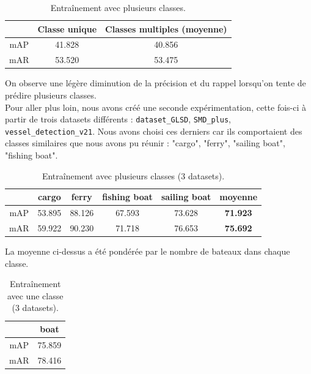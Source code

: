 \begin{table}[h]
    \begin{center}
        \begin{tabular}{c c c}
            \hline
            & Classe unique & Classes multiples (moyenne) \\
            \hline
                mAP & 41.828 & 40.856 \\
                mAR & 53.520 & 53.475 \\
        \end{tabular}
    \end{center}
    \caption{Entraînement avec plusieurs classes.}
\end{table}

On observe une légère diminution de la précision et du rappel lorsqu'on tente de prédire plusieurs
classes. \\

Pour aller plus loin, nous avons créé une seconde expérimentation, cette fois-ci à partir
de trois datasets différents : \texttt{dataset\_GLSD}, \texttt{SMD\_plus}, \texttt{vessel\_detection\_v21}.
Nous avons choisi ces derniers car ils comportaient des classes similaires que nous avons pu réunir :
"cargo", "ferry", "sailing boat", "fishing boat". \\

\begin{table}[H]
    \begin{center}
        \begin{tabular}{c c c c c c}
            \hline
            & cargo & ferry & fishing boat & sailing boat & \textbf{moyenne} \\
            \hline
                mAP & 53.895 & 88.126 & 67.593 & 73.628 & \textbf{71.923}\\
                mAR & 59.922 & 90.230 & 71.718 & 76.653 & \textbf{75.692}\\
        \end{tabular}
    \end{center}
    \caption{Entraînement avec plusieurs classes (3 datasets).}
\end{table}

La moyenne ci-dessus a été pondérée par le nombre de bateaux dans chaque classe. 

\begin{table}[H]
    \begin{center}
        \begin{tabular}{c c}
            \hline
            & boat  \\
            \hline
                mAP & 75.859 \\
                mAR & 78.416 \\
        \end{tabular}
    \end{center}
    \caption{Entraînement avec une classe (3 datasets).}
\end{table}

